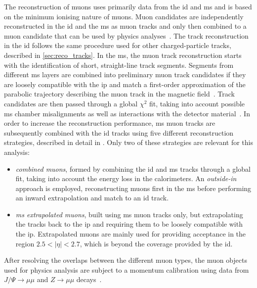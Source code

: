 The reconstruction of muons uses primarily data from the \gls{id} and \gls{ms} and is based on the minimum ionising nature of muons. Muon candidates are independently reconstructed in the \gls{id} and the \gls{ms} as muon tracks and only then combined to a muon candidate that can be used by physics analyses~\cite{PERF-2015-10,Aad:2020gmm}.
The track reconstruction in the \gls{id} follows the same procedure used for other charged-particle tracks, described in \cref{sec:reco_tracks}.
In the \gls{ms}, the muon track reconstruction starts with the identification of short, straight-line track segments. Segments from different \gls{ms} layers are combined into preliminary muon track candidates if they are loosely compatible with the \gls{ip} and match a first-order approximation of the parabolic trajectory describing the muon track in the magnetic field~\cite{Aad:2020gmm}.
Track candidates are then passed through a global $\chi^2$ fit, taking into account possible \gls{ms} chamber misalignments as well as interactions with the detector material~\cite{Aad:2020gmm}.
In order to increase the reconstruction performance, \gls{ms} muon tracks are subsequently combined with the \gls{id} tracks using five different reconstruction strategies, described in detail in \cite{Aad:2020gmm}.
Only two of these strategies are relevant for this analysis:
\begin{itemize}
	\item \textit{combined muons}, formed by combining the \gls{id} and \gls{ms} tracks through a global fit, taking into account the energy loss in the calorimeters. An \textit{outside-in} approach is employed, reconstructing muons first in the \gls{ms} before performing an inward extrapolation and match to an \gls{id} track.
	\item \textit{\gls{ms} extrapolated muons}, built using \gls{ms} muon tracks only, but extrapolating the tracks back to the \gls{ip} and requiring them to be loosely compatible with the \gls{ip}. Extrapolated muons are mainly used for providing acceptance in the region $2.5 < \vert\eta\vert < 2.7$, which is beyond the coverage provided by the \gls{id}.
\end{itemize}
After resolving the overlaps between the different muon types, the muon objects used for physics analysis are subject to a momentum calibration using data from $J/\Psi\rightarrow\mu\mu$ and $Z\rightarrow\mu\mu$ decays~\cite{Aad:2020gmm}.

